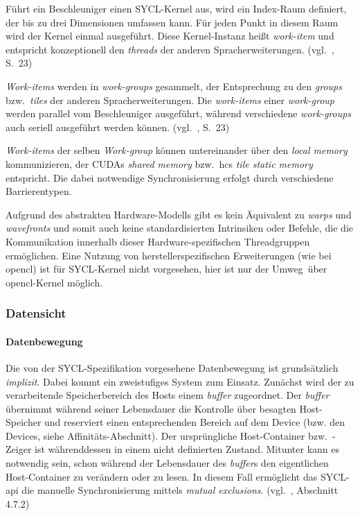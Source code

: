 Führt ein Beschleuniger einen SYCL-Kernel aus, wird ein Index-Raum definiert,
der bis zu drei Dimensionen umfassen kann. Für jeden Punkt in diesem Raum wird
der Kernel einmal ausgeführt. Diese Kernel-Instanz heißt \textit{work-item} und
entspricht konzeptionell den \textit{threads} der anderen Spracherweiterungen.
(vgl.~\cite{syclspec}, S.\ 23)

\textit{Work-items} werden in \textit{work-groups} gesammelt, der Entsprechung
zu den \textit{groups} bzw.\ \textit{tiles} der anderen Spracherweiterungen.
Die \textit{work-items} einer \textit{work-group} werden parallel vom
Beschleuniger ausgeführt, während verschiedene \textit{work-groups} auch seriell
ausgeführt werden können.
(vgl.~\cite{syclspec}, S.\ 23)

\textit{Work-items} der selben \textit{Work-group} können untereinander über
den \textit{local memory} kommunizieren, der CUDAs \textit{shared memory} bzw.\
\gls{hc}s \textit{tile static memory} entspricht. Die dabei notwendige
Synchronisierung erfolgt durch verschiedene Barrierentypen.

Aufgrund des abstrakten Hardware-Modells gibt es kein Äquivalent zu
\textit{warps} und \textit{wavefronts} und somit auch keine standardisierten
Intrinsiken oder Befehle, die die Kommunikation innerhalb dieser
Hardware-spezifischen Threadgruppen ermöglichen. Eine Nutzung von
herstellerspezifischen Erweiterungen (wie bei \gls{opencl}) ist für SYCL-Kernel
nicht vorgesehen, hier ist nur der \glqq Umweg\grqq\ über \gls{opencl}-Kernel
möglich.

\subsubsection{Datensicht}

\paragraph{Datenbewegung}

Die von der SYCL-Spezifikation vorgesehene Datenbewegung ist grundsätzlich
\textit{implizit}. Dabei kommt ein zweistufiges System zum Einsatz. Zunächst
wird der zu verarbeitende Speicherbereich des Hosts einem \textit{buffer}
zugeordnet. Der \textit{buffer} übernimmt während seiner Lebensdauer die
Kontrolle über besagten Host-Speicher und reserviert einen entsprechenden
Bereich auf dem Device (bzw. den Devices, siehe Affinitäts-Abschnitt). Der
ursprüngliche Host-Container bzw.\ -Zeiger ist währenddessen in einem nicht
definierten Zustand. Mitunter kann es notwendig sein, schon während der
Lebensdauer des \textit{buffer}s den eigentlichen Host-Container zu verändern
oder zu lesen. In diesem Fall ermöglicht das SYCL-\gls{api} die manuelle
Synchronisierung mittels \textit{mutual exclusions}.
(vgl.~\cite{syclspec}, Abschnitt 4.7.2)

